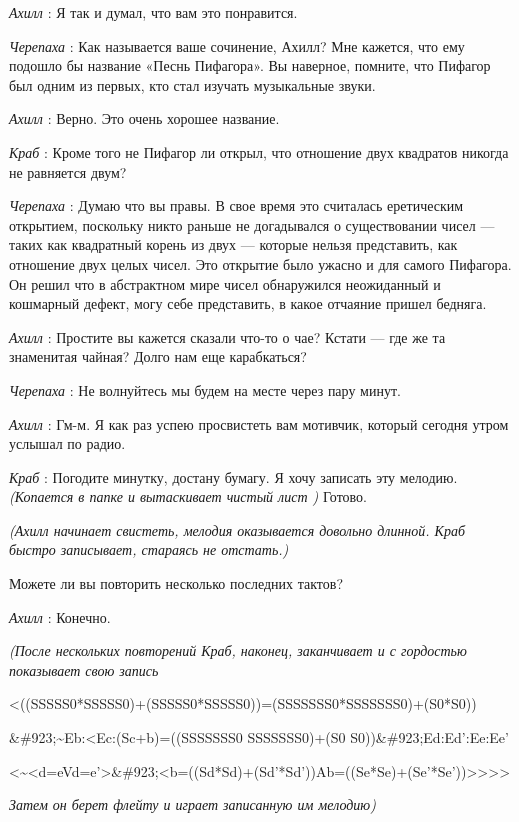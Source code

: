 \documentclass[../main.tex]{subfiles}
\begin{document}
\begin{dialogue}
\emph{Ахилл} : Я так и думал, что вам это понравится.

\emph{Черепаха} : Как называется ваше сочинение, Ахилл? Мне кажется, что ему подошло бы название «Песнь Пифагора». Вы наверное, помните, что Пифагор был одним из первых, кто стал изучать музыкальные звуки.

\emph{Ахилл} : Верно. Это очень хорошее название.

\emph{Краб} : Кроме того не Пифагор ли открыл, что отношение двух квадратов никогда не равняется двум?

\emph{Черепаха} : Думаю что вы правы. В свое время это считалась еретическим открытием, поскольку никто раньше не догадывался о существовании чисел --- таких как квадратный корень из двух --- которые нельзя представить, как отношение двух целых чисел. Это открытие было ужасно и для самого Пифагора. Он решил что в абстрактном мире чисел обнаружился неожиданный и кошмарный дефект, могу себе представить, в какое отчаяние пришел бедняга.

\emph{Ахилл} : Простите вы кажется сказали что-то о чае? Кстати --- где же та знаменитая чайная? Долго нам еще карабкаться?

\emph{Черепаха} : Не волнуйтесь мы будем на месте через пару минут.

\emph{Ахилл} : Гм-м. Я как раз успею просвистеть вам мотивчик, который сегодня утром услышал по радио.

\emph{Краб} : Погодите минутку, достану бумагу. Я хочу записать эту мелодию. \emph{(Копается в папке и вытаскивает чистый лист )} Готово.

\emph{(Ахилл начинает свистеть, мелодия оказывается довольно длинной. Краб быстро записывает, стараясь не отстать.)}

Можете ли вы повторить несколько последних тактов?

\emph{Ахилл} : Конечно.

\emph{(После нескольких повторений Краб, наконец, заканчивает и с гордостью показывает свою запись}

\textless((SSSSS0*SSSSS0)+(SSSSS0*SSSSS0))=(SSSSSSS0*SSSSSSS0)+(S0*S0))

\&\#923;\textasciitilde Eb:\textless Ec:(Sc+b)=((SSSSSSS0 SSSSSSS0)+(S0 S0))\&\#923;Ed:Ed':Ee:Ee'

\textless\textasciitilde\textless d=eVd=e'\textgreater\&\#923;\textless b=((Sd*Sd)+(Sd'*Sd'))Ab=((Se*Se)+(Se'*Se'))\textgreater\textgreater\textgreater\textgreater{}

\emph{Затем он берет флейту и играет записанную им мелодию)}


\end{dialogue}
\end{document}
